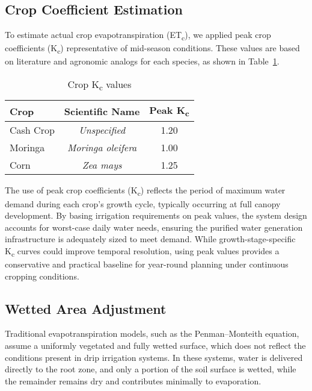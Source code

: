 \documentclass[twocolumn]{article}
\begin{document}
\subsection{Crop Coefficient Estimation}

To estimate actual crop evapotranspiration (ET\textsubscript{c}), we applied peak crop coefficients (K\textsubscript{c}) representative of mid-season conditions. These values are based on literature and agronomic analogs for each species\cite{moringa2017}\cite{maize2023}, as shown in Table~\ref{tab:kc-values}.

\begin{table}[h]
\centering
\caption{Crop K\textsubscript{c} values}
\label{tab:kc-values}
\begin{tabular}{lcc}
\hline
\textbf{Crop} & \textbf{Scientific Name} & \textbf{Peak K\textsubscript{c}} \\
\hline
Cash Crop & \textit{Unspecified} & 1.20 \\
Moringa & \textit{Moringa oleifera} & 1.00 \\
Corn & \textit{Zea mays} & 1.25 \\
\hline
\end{tabular}
\end{table}

The use of peak crop coefficients (K\textsubscript{c}) reflects the period of maximum water demand during each crop’s growth cycle, typically occurring at full canopy development. By basing irrigation requirements on peak values, the system design accounts for worst-case daily water needs, ensuring the purified water generation infrastructure is adequately sized to meet demand. While growth-stage-specific K\textsubscript{c} curves could improve temporal resolution, using peak values provides a conservative and practical baseline for year-round planning under continuous cropping conditions.

\subsection{Wetted Area Adjustment}

Traditional evapotranspiration models, such as the Penman–Monteith equation, assume a uniformly vegetated and fully wetted surface\cite{karimi2020}, which does not reflect the conditions present in drip irrigation systems. In these systems, water is delivered directly to the root zone, and only a portion of the soil surface is wetted, while the remainder remains dry and contributes minimally to evaporation.
\end{document}

